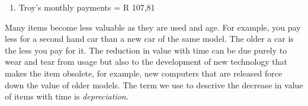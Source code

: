 {\begin{mdframed}[linewidth=4, leftmargin=40, rightmargin=40]
\begin{exercise}
\begin{enumerate}[noitemsep, label=\textbf{Step} \textbf{\arabic*}. ]
        \item  
        \label{m39332*id71325}Troy's monthly payments = R 107,81
 \par 
        \end{enumerate}
    \end{exercise}
    \end{mdframed}
    }
    \noindent
        \label{m39332*id71341}Many items become less valuable as they are used and age. For example, you pay less for a second hand car than a new car of the same model. The older a car is the less you pay for it. The reduction in value with time can be due purely to wear and tear from usage but also to the development of new technology that makes the item obsolete, for example, new computers that are released force down the value of older models. The term we use to descrive the decrease in value of items with time is \textsl{depreciation}.\par 
